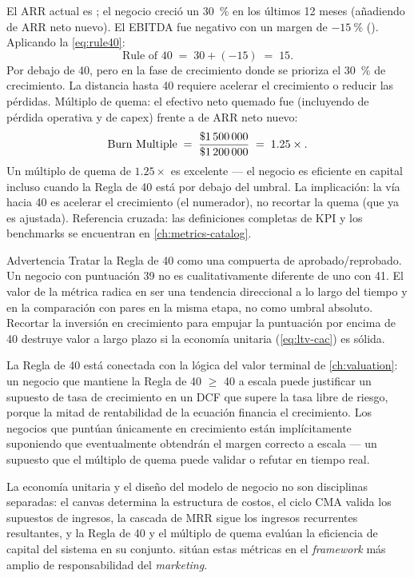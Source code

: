 \begin{example}
El ARR actual es ; el negocio creció un \qty{30}{\percent} en los últimos 12 meses (añadiendo  de ARR neto nuevo). El EBITDA fue negativo con un margen de \(\qty{-15}{\percent}\) (). Aplicando la \cref{eq:rule40}:
\[
  \text{Rule of 40} \;=\; 30 + (-15) \;=\; 15.
\]
Por debajo de 40, pero en la fase de crecimiento donde se prioriza el \qty{30}{\percent} de crecimiento. La distancia hasta 40 requiere acelerar el crecimiento o reducir las pérdidas. Múltiplo de quema: el efectivo neto quemado fue  (incluyendo  de pérdida operativa y  de capex) frente a  de ARR neto nuevo:
\[
  \text{Burn Multiple} \;=\; \frac{\$\num{1500000}}{\$\num{1200000}} \;=\; 1.25\times.
\]
Un múltiplo de quema de \(1.25\times\) es excelente --- el negocio es eficiente en capital incluso cuando la Regla de 40 está por debajo del umbral. La implicación: la vía hacia 40 es acelerar el crecimiento (el numerador), no recortar la quema (que ya es ajustada). Referencia cruzada: las definiciones completas de KPI y los benchmarks se encuentran en \cref{ch:metrics-catalog}.
\end{example}

\begin{admonition}{Advertencia}
Tratar la Regla de 40 como una compuerta de aprobado/reprobado. Un negocio con puntuación 39 no es cualitativamente diferente de uno con 41. El valor de la métrica radica en ser una tendencia direccional a lo largo del tiempo y en la comparación con pares en la misma etapa, no como umbral absoluto. Recortar la inversión en crecimiento para empujar la puntuación por encima de 40 destruye valor a largo plazo si la economía unitaria (\cref{eq:ltv-cac}) es sólida.
\end{admonition}

La Regla de 40 está conectada con la lógica del valor terminal de \cref{ch:valuation}: un negocio que mantiene la Regla de 40 $\ge$ 40 a escala puede justificar un supuesto de tasa de crecimiento en un DCF que supere la tasa libre de riesgo, porque la mitad de rentabilidad de la ecuación financia el crecimiento. Los negocios que puntúan únicamente en crecimiento están implícitamente suponiendo que eventualmente obtendrán el margen correcto a escala --- un supuesto que el múltiplo de quema puede validar o refutar en tiempo real.

La economía unitaria y el diseño del modelo de negocio no son disciplinas separadas: el canvas determina la estructura de costos, el ciclo CMA valida los supuestos de ingresos, la cascada de MRR sigue los ingresos recurrentes resultantes, y la Regla de 40 y el múltiplo de quema evalúan la eficiencia de capital del sistema en su conjunto. \textcite{bendle2020marketing} sitúan estas métricas en el \emph{framework} más amplio de responsabilidad del \emph{marketing}.
